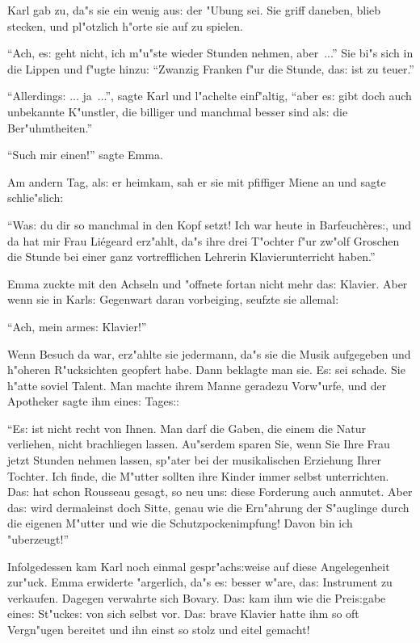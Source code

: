 \documentclass[oneside,12pt]{book}
\newcommand{\s}{s:}%
\begin{document}
Karl gab zu, da"s sie ein wenig au{\s} der "Ubung sei. Sie griff
daneben, blieb stecken, und pl"otzlich h"orte sie auf zu spielen.

"`Ach, e{\s} geht nicht, ich m"u"ste wieder Stunden nehmen,
aber~..."' Sie bi"s sich in die Lippen und f"ugte hinzu: "`Zwanzig
Franken f"ur die Stunde, da{\s} ist zu teuer."'

"`Allerding{\s} ... ja~..."', sagte Karl und l"achelte einf"altig,
"`aber e{\s} gibt doch auch unbekannte K"unstler, die billiger und
manchmal besser sind al{\s} die Ber"uhmtheiten."'

"`Such mir einen!"' sagte Emma.

Am andern Tag, al{\s} er heimkam, sah er sie mit pfiffiger Miene
an und sagte schlie"slich:

"`Wa{\s} du dir so manchmal in den Kopf setzt! Ich war heute in
Barfeuch\`ere{\s}, und da hat mir Frau Li\'egeard erz"ahlt, da"s
ihre drei T"ochter f"ur zw"olf Groschen die Stunde bei einer ganz
vortrefflichen Lehrerin Klavierunterricht haben."'

Emma zuckte mit den Achseln und "offnete fortan nicht mehr da{\s}
Klavier. Aber wenn sie in Karl{\s} Gegenwart daran vorbeiging,
seufzte sie allemal:

"`Ach, mein arme{\s} Klavier!"'

Wenn Besuch da war, erz"ahlte sie jedermann, da"s sie die Musik
aufgegeben und h"oheren R"ucksichten geopfert habe. Dann beklagte
man sie. E{\s} sei schade. Sie h"atte soviel Talent. Man machte
ihrem Manne geradezu Vorw"urfe, und der Apotheker sagte ihm
eine{\s} Tage{\s}:

"`E{\s} ist nicht recht von Ihnen. Man darf die Gaben, die einem
die Natur verliehen, nicht brachliegen lassen. Au"serdem sparen
Sie, wenn Sie Ihre Frau jetzt Stunden nehmen lassen, sp"ater bei
der musikalischen Erziehung Ihrer Tochter. Ich finde, die M"utter
sollten ihre Kinder immer selbst unterrichten. Da{\s} hat schon
Rousseau gesagt, so neu un{\s} diese Forderung auch anmutet. Aber
da{\s} wird dermaleinst doch Sitte, genau wie die Ern"ahrung der
S"auglinge durch die eigenen M"utter und wie die
Schutzpockenimpfung! Davon bin ich "uberzeugt!"'

Infolgedessen kam Karl noch einmal gespr"ach{\s}weise auf diese
Angelegenheit zur"uck. Emma erwiderte "argerlich, da"s e{\s}
besser w"are, da{\s} Instrument zu verkaufen. Dagegen verwahrte
sich Bovary. Da{\s} kam ihm wie die Prei{\s}gabe eine{\s}
St"ucke{\s} von sich selbst vor. Da{\s} brave Klavier hatte ihm so
oft Vergn"ugen bereitet und ihn einst so stolz und eitel gemacht!
\end{document}
